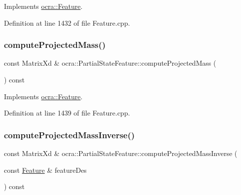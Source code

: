 Implements \hyperlink{classocra_1_1Feature_a44e11dd349e92971fefebff354e7214b}{ocra\+::\+Feature}.



Definition at line 1432 of file Feature.\+cpp.

\hypertarget{classocra_1_1PartialStateFeature_a984c0fd5400ff69faaab55d81cf8320b}{}\label{classocra_1_1PartialStateFeature_a984c0fd5400ff69faaab55d81cf8320b} 
\subsubsection{\texorpdfstring{compute\+Projected\+Mass()}{computeProjectedMass()}\hspace{0.1cm}{\footnotesize\ttfamily [2/2]}}
{\footnotesize\ttfamily const Matrix\+Xd \& ocra\+::\+Partial\+State\+Feature\+::compute\+Projected\+Mass (\begin{DoxyParamCaption}{ }\end{DoxyParamCaption}) const\hspace{0.3cm}{\ttfamily [virtual]}}



Implements \hyperlink{classocra_1_1Feature_a99ac023809c0cf34b5d582537934b08c}{ocra\+::\+Feature}.



Definition at line 1439 of file Feature.\+cpp.

\hypertarget{classocra_1_1PartialStateFeature_acebec8dd4cadc55641a9286fb3685674}{}\label{classocra_1_1PartialStateFeature_acebec8dd4cadc55641a9286fb3685674} 
\subsubsection{\texorpdfstring{compute\+Projected\+Mass\+Inverse()}{computeProjectedMassInverse()}\hspace{0.1cm}{\footnotesize\ttfamily [1/2]}}
{\footnotesize\ttfamily const Matrix\+Xd \& ocra\+::\+Partial\+State\+Feature\+::compute\+Projected\+Mass\+Inverse (\begin{DoxyParamCaption}\item[{const \hyperlink{classocra_1_1Feature}{Feature} \&}]{feature\+Des }\end{DoxyParamCaption}) const\hspace{0.3cm}{\ttfamily [virtual]}}



